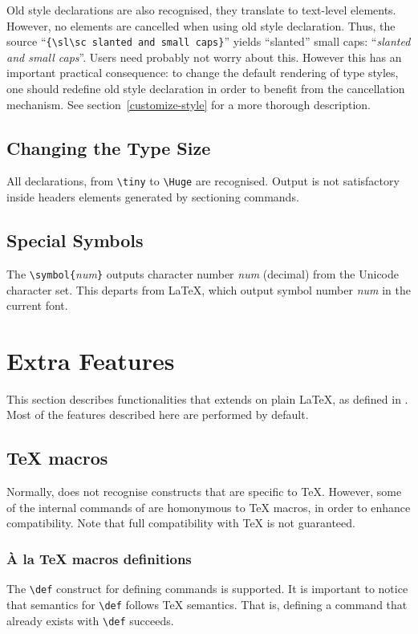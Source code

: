 Old style declarations are also recognised, they translate to
text-level elements. However, no elements are cancelled when using
old style declaration. Thus, the source
``\verb+{\sl\sc slanted and small caps}+'' yields ``slanted''
small caps\ifhevea: ``{\sl\sc slanted and small caps}''\fi.
Users need probably not worry about this. However this has an
important practical consequence: to change the default rendering of
type styles, one should redefine old style declaration in order to
benefit from the cancellation mechanism. See
section~\ref{customize-style} for a more thorough description.


\subsection{Changing the Type Size}
All declarations, from \verb+\tiny+ to \verb+\Huge+ are recognised.
Output is not satisfactory inside headers elements
generated by sectioning commands.

\subsection{Special Symbols}

The \verb+\symbol{+{\it num}\verb+}+ outputs character number {\it num}
(decimal) from the Unicode character set.
This departs from \LaTeX{}, which output symbol number \textit{num} in
the current font.

\section{Extra Features}
This section describes \hevea{} functionalities that extends on plain \LaTeX{},
as defined in \cite{latex}.
Most of the features described here are performed by default.

\subsection{\TeX{} macros}\label{texmacro}
Normally, \hevea{} does not recognise constructs that are specific to
\TeX{}.
However, some of the internal commands of \hevea{} are homonymous to
\TeX{} macros, in order to enhance compatibility.
Note that full compatibility with \TeX{} is not guaranteed.


\subsubsection{\`A la \TeX{} macros definitions}\label{texmacros}
The \verb+\def+ construct for defining commands is supported.
It is important to
notice that \hevea{} semantics for \verb+\def+ 
follows \TeX{} semantics.
That is, defining a command that already
exists with \verb+\def+ succeeds.

